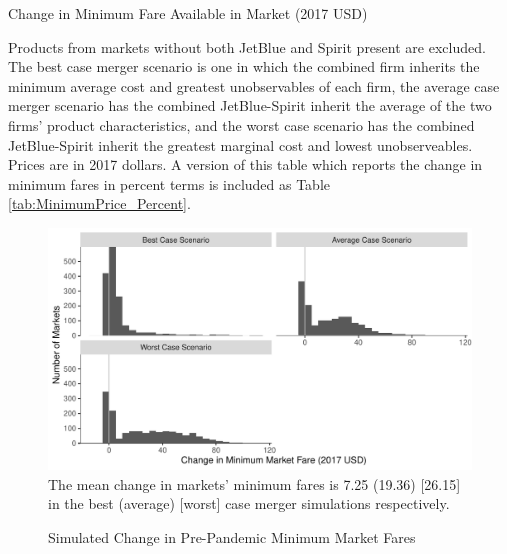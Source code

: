 \documentclass{article}
\begin{document}
    \begin{table}
        \caption{Change in Minimum Fare Available in Market (2017 USD)}
        \label{tab:MinimumPrice}
                \vspace{-15mm}
        \begin{center}
            
        \end{center}
        \vspace{-5mm}
        \footnotesize{Products from markets without both JetBlue and Spirit present are excluded. The best case merger scenario is one in which the combined firm inherits the minimum average cost and greatest unobservables of each firm, the average case merger scenario has the combined JetBlue-Spirit inherit the average of the two firms' product characteristics, and the worst case scenario has the combined JetBlue-Spirit inherit the greatest marginal cost and lowest unobserveables. Prices are in 2017 dollars. A version of this table which reports the change in minimum fares in percent terms is included as Table        \ref{tab:MinimumPrice_Percent}.}
    \end{table}    

      \begin{figure}
    \caption{Simulated Change in Pre-Pandemic Minimum Market Fares}
    \includegraphics[width = \linewidth]{PrePandemic_Merger_Change_MinimumFare_Dist}
    \label{fig:PrePan_MinimumFare_Dist}
    \footnotesize{The mean change in markets' minimum fares is 7.25 (19.36) [26.15] in the best (average) [worst] case merger simulations respectively.}  
    \end{figure}    
\end{document}
